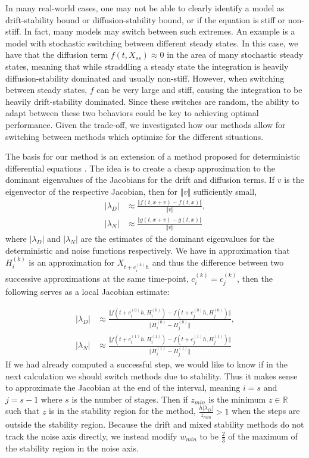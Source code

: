 \documentclass{article}
\begin{document}
In many real-world cases, one may not be able to clearly identify
a model as drift-stability bound or diffusion-stability bound, or
if the equation is stiff or non-stiff. In fact, many models may switch
between such extremes. An example is a model with stochastic switching
between different steady states. In this case, we have that the diffusion
term $f(t,X_{ss})\approx0$ in the area of many stochastic steady
states, meaning that while straddling a steady state the integration
is heavily diffusion-stability dominated and usually non-stiff. However,
when switching between steady states, $f$ can be very large and stiff,
causing the integration to be heavily drift-stability dominated. Since
these switches are random, the ability to adapt between these two
behaviors could be key to achieving optimal performance. Given the
trade-off, we investigated how our methods allow for switching between
methods which optimize for the different situations.

The basis for our method is an extension of a method proposed for
deterministic differential equations \cite{RN3527,RN3526,RN3790}.
The idea is to create a cheap approximation to the dominant eigenvalues
of the Jacobians for the drift and diffusion terms. If $v$ is the
eigenvector of the respective Jacobian, then for $\Vert v\Vert$ sufficiently
small,
\begin{align}
\left|\lambda_{D}\right|&\approx\frac{\Vert f(t,x+v)-f(t,x)\Vert}{\Vert v\Vert},\\
\left|\lambda_{N}\right|&\approx\frac{\Vert g(t,x+v)-g(t,x)\Vert}{\Vert v\Vert}\label{eq:eigen}
\end{align}
where $\left|\lambda_{D}\right|$ and $\left|\lambda_{N}\right|$
are the estimates of the dominant eigenvalues for the deterministic
and noise functions respectively. We have in approximation that $H_{i}^{(k)}$
is an approximation for $X_{t+c_{i}^{(k)}h}$ and thus the difference
between two successive approximations at the same time-point, $c_{i}^{(k)}=c_{j}^{(k)}$,
then the following serves as a local Jacobian estimate:

\begin{align}
\left|\lambda_{D}\right|&\approx\frac{\Vert f(t+c_{i}^{(0)}h,H_{i}^{(0)})-f(t+c_{j}^{(0)}h,H_{j}^{(0)})\Vert}{\Vert H_{i}^{(0)}-H_{j}^{(0)}\Vert},\\
\left|\lambda_{N}\right|&\approx\frac{\Vert f(t+c_{i}^{(1)}h,H_{i}^{(1)})-f(t+c_{j}^{(1)}h,H_{j}^{(1)})\Vert}{\Vert H_{i}^{(1)}-H_{j}^{(1)}\Vert}\label{eq:local_eigen}
\end{align}
If we had already computed a successful step, we would like to know
if in the next calculation we should switch methods due to stability.
Thus it makes sense to approximate the Jacobian at the end of the
interval, meaning $i=s$ and $j=s-1$ where $s$ is the number of
stages. Then if $z_{min}$ is the minimum $z\in\mathbb{R}$ such that
$z$ is in the stability region for the method, $\frac{h\left|\lambda_{D}\right|}{z_{min}}>1$
when the steps are outside the stability region. Because the drift
and mixed stability methods do not track the noise axis directly,
we instead modify $w_{min}$ to be $\frac{2}{3}$ of the maximum of
the stability region in the noise axis.
\end{document}
